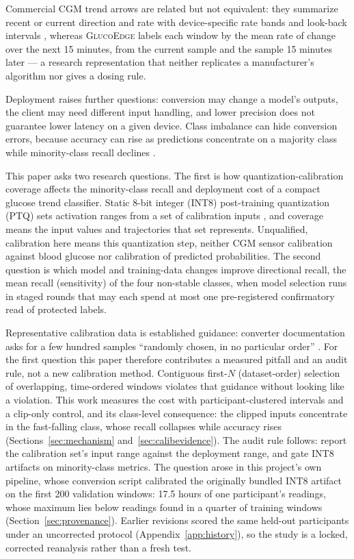 \documentclass[10pt,twocolumn]{article}
\newcommand{\project}{\textsc{GlucoEdge}\xspace}
\begin{document}
Commercial CGM trend arrows are related but not equivalent: they summarize
recent or current direction and rate with device-specific rate bands and
look-back intervals \cite{pettus2017recommendations,rodacki2021trend},
whereas \project labels each window by the mean rate of change over the
next 15 minutes, from the current sample and the sample 15 minutes later
--- a research representation that neither replicates a manufacturer's
algorithm nor gives a dosing rule.

Deployment raises further questions: conversion may change a model's
outputs, the client may need different input handling, and lower precision
does not guarantee lower latency on a given device. Class imbalance can
hide conversion errors, because accuracy can rise as predictions
concentrate on a majority class while minority-class recall declines
\cite{brodersen2010balanced}.

This paper asks two research questions. The first is how
quantization-calibration coverage affects the minority-class recall and
deployment cost of a compact glucose trend classifier. Static 8-bit integer
(INT8) post-training quantization (PTQ) sets activation ranges from a set
of calibration inputs \cite{jacob2018quantization,pytorchPT2E2026}, and
coverage means the input values and trajectories that set represents.
Unqualified, calibration here means this quantization step, neither CGM
sensor calibration against blood glucose nor calibration of predicted
probabilities. The second question is which model and training-data
changes improve directional recall, the mean recall (sensitivity) of the
four non-stable classes, when model selection runs in staged rounds that
may each spend at most one pre-registered confirmatory read of protected
labels.

Representative calibration data is established guidance: converter
documentation asks for a few hundred samples ``randomly chosen, in no
particular order'' \cite{googleRepresentativeData}. For the first
question this paper therefore contributes a measured pitfall and an audit
rule, not a new calibration method. Contiguous first-$N$ (dataset-order)
selection of overlapping, time-ordered windows violates that guidance
without looking like a violation. This work measures the cost with
participant-clustered intervals and a clip-only control, and its
class-level consequence: the clipped inputs concentrate in the
fast-falling class, whose recall collapses while accuracy rises
(Sections~\ref{sec:mechanism} and~\ref{sec:calibevidence}). The audit rule
follows: report the calibration set's input range against the deployment
range, and gate INT8 artifacts on minority-class metrics. The question
arose in this project's own pipeline, whose conversion script calibrated
the originally bundled INT8 artifact on the first 200 validation windows:
17.5 hours of one participant's readings, whose maximum lies below
readings found in a quarter of training windows
(Section~\ref{sec:provenance}). Earlier revisions scored the same held-out
participants under an uncorrected protocol (Appendix~\ref{app:history}),
so the study is a locked, corrected reanalysis rather than a fresh test.
\end{document}
